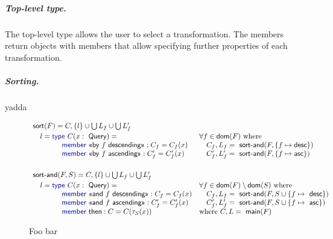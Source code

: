\documentclass[a4paper,UKenglish]{lipics-v2016}
\theoremstyle{plain}
\theoremstyle{definition}
\newcommand{\kvd}[1]{\textnormal{\textcolor{kvdclr}{\sffamily #1}}}
\newcommand{\ident}[1]{\textnormal{\sffamily #1}}
\newcommand{\qident}[1]{\textnormal{\sffamily \guillemotleft #1\guillemotright}}
\newcommand{\dom}{\ident{dom}}
\begin{document}
\subparagraph{Top-level type.} The top-level type allows the user to select a transformation. The
members return objects with members that allow specifying further properties of each transformation.




\subparagraph{Sorting.} yadda

\begin{figure}
\begin{equation*}
\begin{array}{ll}
\ident{sort}(F) = C, \{l\} \cup \bigcup L_f \cup \bigcup L'_f\\[0.25em]
\quad l = \kvd{type}~C(x:\ident{Query}) = &\forall f\in\dom(F)~\textnormal{where} \\
\qquad \qquad \kvd{member}~\qident{by $f$ descending} : C_f = C_f(x) &\quad C_f, L_f = \ident{sort-and}(F, \{ f \mapsto \ident{desc} \})\\
\qquad \qquad \kvd{member}~\qident{by $f$ ascending} : C'_f = C'_f(x) &\quad C'_f, L'_f = \ident{sort-and}(F, \{ f \mapsto \ident{asc} \})\\
\\[0.5em]
\ident{sort-and}(F,S) = C, \{l\} \cup \bigcup L_f \cup \bigcup L'_f\\[0.25em]
\quad l = \kvd{type}~C(x:\ident{Query}) = &\forall f\in\dom(F)\setminus\dom(S)~\textnormal{where} \\
\qquad \qquad \kvd{member}~\qident{and $f$ descending} : C_f = C_f(x) &\quad C_f, L_f = \ident{sort-and}(F, S\cup\{ f \mapsto \ident{desc} \})\\
\qquad \qquad \kvd{member}~\qident{and $f$ ascending} : C'_f = C'_f(x) &\quad C'_f, L'_f = \ident{sort-and}(F, S\cup\{ f \mapsto \ident{asc} \})\\
\qquad \qquad \kvd{member}~\ident{then} : C = C(\tau_S(x))                 &\textnormal{where}~C, L = \ident{main}(F)\\
\end{array}
\end{equation*}
\caption{Foo bar}
\label{fig:foobar}
\end{figure}
\end{document}
